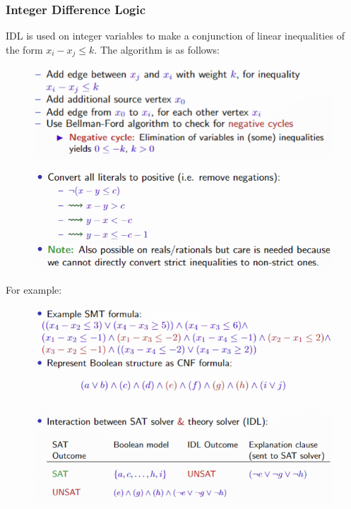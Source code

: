\documentclass[10pt,a4paper]{report}
\begin{document}
\subsubsection{Integer Difference Logic}
IDL is used on integer variables to make a conjunction of linear inequalities of the form $x_i - x_j \leq k$. The algorithm is as follows:
\begin{figure}[H]
    \centering
    \includegraphics[scale=0.5]{34.png}
\end{figure}
\begin{figure}[H]
    \centering
    \includegraphics[scale=0.5]{35.png}
\end{figure}
For example:
\begin{figure}[H]
    \centering
    \includegraphics[scale=0.5]{36.png}
\end{figure}
\end{document}
